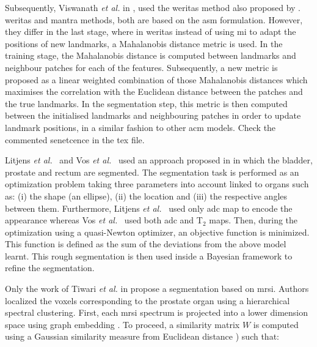 Subsequently, Viswanath \textit{et al.} in \cite{Viswanath2012}, used the \ac{weritas} method also proposed by \cite{Toth2009}.
\Ac{weritas} and \ac{mantra} methods, both are based on the \ac{asm} formulation.
However, they differ in the last stage, where in \ac{weritas} instead of using \ac{mi} to adapt the positions of new landmarks, a Mahalanobis distance metric is used.
In the training stage, the Mahalanobis distance is computed between landmarks and neighbour patches for each of the features.
Subsequently, a new metric is proposed as a linear weighted combination of those Mahalanobis distances which maximises the correlation with the Euclidean distance between the patches and the true landmarks.
In the segmentation step, this metric is then computed between the initialised landmarks and neighbouring patches in order to update landmark positions, in a similar fashion to other \ac{acm} models. 
{\color{red} Check the commented senetcence in the tex file.}



Litjens \textit{et al.}~\cite{Litjens2011} and Vos \textit{et al.}~\cite{Vos2012} used an approach proposed in \cite{Huisman2010} in which the bladder, prostate and rectum are segmented.
The segmentation task is performed as an optimization problem taking three parameters into account linked to organs such as: (i) the shape (an ellipse), (ii) the location and (iii) the respective angles between them.
Furthermore, Litjens \textit{et al.}~\cite{Litjens2011} used only \ac{adc} map to encode the appearance whereas Vos \textit{et al.}~\cite{Vos2012} used both \ac{adc} and T$_2$ maps.
Then, during the optimization using a quasi-Newton optimizer, an objective function is minimized.
This function is defined as the sum of the deviations from the above model learnt.
This rough segmentation is then used inside a Bayesian framework to refine the segmentation.

Only the work of Tiwari \textit{et al.} in \cite{Tiwari2009} propose a segmentation based on \ac{mrsi}.
Authors localized the voxels corresponding to the prostate organ using a hierarchical spectral clustering.
First, each \ac{mrsi} spectrum is projected into a lower dimension space using graph embedding \cite{Shi2000}.
To proceed, a similarity matrix $W$ is computed using a Gaussian similarity measure from Euclidean distance \cite{Belkin2001}) such that:

